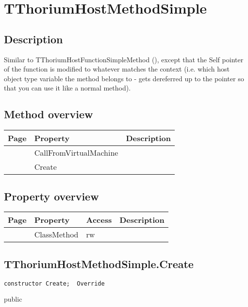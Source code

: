 \section{TThoriumHostMethodSimple}
\label{thoriumcorepkg:thorium:tthoriumhostmethodsimple}
\subsection{Description}
Similar to TThoriumHostFunctionSimpleMethod (\pageref{thoriumcorepkg:thorium:tthoriumhostfunctionsimplemethod}), except that the Self pointer of the function is modified to whatever matches the context (i.e. which host object type variable the method belongs to - gets dereferred up to the pointer so that you can use it like a normal method).%
\subsection{Method overview}
\label{thoriumcorepkg:thorium:tthoriumhostmethodsimple:methods}
\begin{tabularx}{\textwidth}{llX}
Page & Property & Description  \\ \hline
\pageref{thoriumcorepkg:thorium:tthoriumhostmethodsimple:callfromvirtualmachine} & CallFromVirtualMachine  &  \\
\pageref{thoriumcorepkg:thorium:tthoriumhostmethodsimple:create} & Create  &  \\
\hline
\end{tabularx}
\subsection{Property overview}
\label{thoriumcorepkg:thorium:tthoriumhostmethodsimple:properties}
\begin{tabularx}{\textwidth}{lllX}
Page & Property & Access & Description \\ \hline
\pageref{thoriumcorepkg:thorium:tthoriumhostmethodsimple:classmethod} & ClassMethod & rw &  \\
\hline
\end{tabularx}
\subsection{TThoriumHostMethodSimple.Create}
\label{thoriumcorepkg:thorium:tthoriumhostmethodsimple:create}
\begin{FPCList}
\Declaration 

\begin{verbatim}
constructor Create;  Override
\end{verbatim}
\Visibility
public
\end{FPCList}
